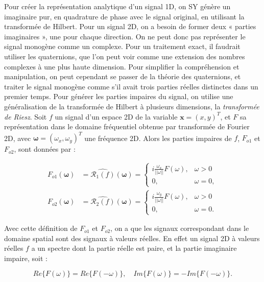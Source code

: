 Pour créer la représentation analytique d'un signal 1D, on SY génère un imaginaire pur, en quadrature de phase avec le signal original, en utilisant la transformée de Hilbert. Pour un signal 2D, on a besoin de former deux « parties imaginaires », une pour chaque direction. On ne peut donc pas représenter le signal monogène comme un complexe. Pour un traitement exact, il faudrait utiliser les quaternions, que l'on peut voir comme une extension des nombres complexes à une plus haute dimension. Pour simplifier la compréhension et manipulation, on peut cependant se passer de la théorie des quaternions, et traiter le signal monogène comme s'il avait trois parties réelles distinctes dans un premier temps.
Pour générer les parties impaires du signal, on utilise une généralisation de la transformée de Hilbert à plusieurs dimensions, la {\it transformée de Riesz}. Soit $f$ un signal d'un espace 2D de la variable $\mathbf{x} = (x, y)^T$, et $F$ sa représentation dans le domaine fréquentiel obtenue par transformée de Fourier 2D, avec $\mathbf{\omega}=(\omega_x, \omega_y)^T$ une fréquence 2D. Alors les parties impaires de $f$, $F_{o1}$ et $F_{o2}$, sont données par :

\begin{align}
    F_{o1}(\mathbf{\omega}) &= \widehat{\mathcal{R}_1(f)}(\mathbf{\omega}) =
        \left\{
        \begin{array}{ll}
            i\frac{\omega_x}{||\omega||}F(\omega), & \omega > 0 \\
            0, & \omega = 0,
        \end{array}
        \right. \\
    F_{o2}(\mathbf{\omega}) &= \widehat{\mathcal{R}_2(f)}(\mathbf{\omega}) =
        \left\{
        \begin{array}{ll}
            i\frac{\omega_y}{||\omega||}F(\omega), & \omega > 0 \\
            0, & \omega = 0.
        \end{array}
        \right.
    \label{eq:2.20}
\end{align}

Avec cette définition de $F_{o1}$ et $F_{o2}$, on a que les signaux correspondant dans le domaine spatial sont des signaux à valeurs réelles. En effet un signal 2D à valeurs réelles $f$ a un spectre dont la partie réelle est paire, et la partie imaginaire impaire, soit :

\begin{equation}
    Re\{F(\omega)\} = Re\{F(-\omega)\}, \quad Im\{F(\omega)\} = -Im\{F(-\omega)\}.
\end{equation}

